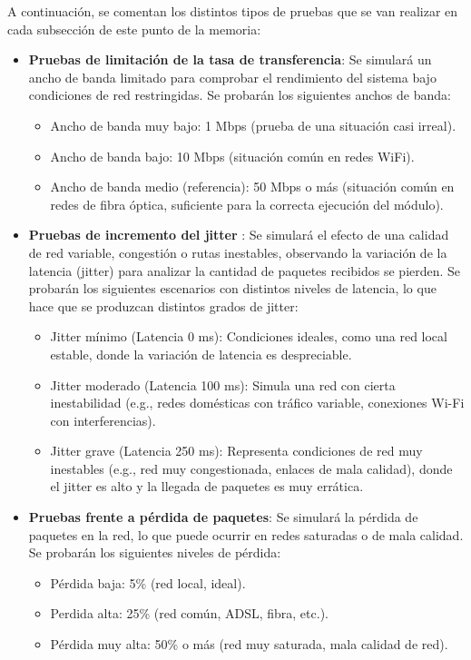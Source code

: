 A continuación, se comentan los distintos tipos de pruebas que se van realizar en cada subsección de este punto de la memoria:
\begin{itemize}
    \item \textbf{Pruebas de limitación de la tasa de transferencia}: Se simulará un ancho de banda limitado para comprobar el rendimiento del sistema bajo condiciones de red restringidas. Se probarán los siguientes anchos de banda:
    \begin{itemize}
        \item Ancho de banda muy bajo: 1 Mbps (prueba de una situación casi irreal).
        \item Ancho de banda bajo: 10 Mbps (situación común en redes WiFi).
        \item Ancho de banda medio (referencia): 50 Mbps o más (situación común en redes de fibra óptica, suficiente para la correcta ejecución del módulo).
    \end{itemize}
    \item \textbf{Pruebas de incremento del jitter} : Se simulará el efecto de una calidad de red variable, congestión o rutas inestables, observando la variación de la latencia (jitter) para analizar la cantidad de paquetes recibidos se pierden. Se probarán los siguientes escenarios con distintos niveles de latencia, lo que hace que se produzcan distintos grados de jitter:
    \begin{itemize}
      \item Jitter mínimo (Latencia 0 ms): Condiciones ideales, como una red local estable, donde la variación de latencia es despreciable.
      \item Jitter moderado (Latencia 100 ms): Simula una red con cierta inestabilidad (e.g., redes domésticas con tráfico variable, conexiones Wi-Fi con interferencias).
      \item Jitter grave (Latencia 250 ms): Representa condiciones de red muy inestables (e.g., red muy congestionada, enlaces de mala calidad), donde el jitter es alto y la llegada de paquetes es muy errática.
    \end{itemize}
    \item \textbf{Pruebas frente a pérdida de paquetes}: Se simulará la pérdida de paquetes en la red, lo que puede ocurrir en redes saturadas o de mala calidad. Se probarán los siguientes niveles de pérdida: 
    \begin{itemize}
        \item Pérdida baja: 5\% (red local, ideal).
        \item Perdida alta: 25\% (red común, ADSL, fibra, etc.).
        \item Pérdida muy alta: 50\% o más (red muy saturada, mala calidad de red).
    \end{itemize}
\end{itemize}

